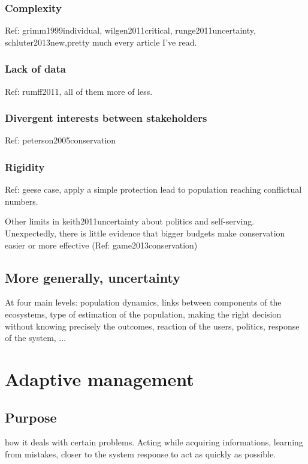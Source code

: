 \documentclass[12pt,a4paper]{article}
\begin{document}
\subsubsection{Complexity}
Ref: grimm1999individual, wilgen2011critical, runge2011uncertainty, schluter2013new,pretty much every article I've read.

\subsubsection{Lack of data}
Ref: rumff2011, all of them more of less.

\subsubsection{Divergent interests between stakeholders}
Ref: peterson2005conservation

\subsubsection{Rigidity}
Ref: geese case, apply a simple protection lead to population reaching conflictual numbers.

Other limits in keith2011uncertainty about politics and self-serving.
Unexpectedly, there is little  evidence that bigger budgets make conservation easier or more effective (Ref: game2013conservation)

\subsection{More generally, uncertainty}
At four main levels: population dynamics, links between components of the ecosystems, type of estimation of the population, making the right decision without knowing precisely the outcomes, reaction of the users, politics, response of the system, ...

\section{Adaptive management}

\subsection{Purpose}

how it deals with certain problems. Acting while acquiring informations, learning from mistakes, closer to the system response to act as quickly as possible.
\end{document}

